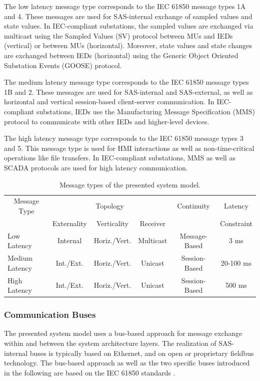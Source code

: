 The low latency message type corresponds to the IEC 61850 \cite{IEC61850P5} message types 1A and 4.
These messages are used for SAS-internal exchange of sampled values and state values.
In IEC-compliant substations, the sampled values are exchanged via multicast using the Sampled Values (SV) protocol between MUs and IEDs (vertical) or between MUs (horizontal).
Moreover, state values and state changes are exchanged between IEDs (horizontal) using the Generic Object Oriented Substation Events (GOOSE) protocol.

The medium latency message type corresponds to the IEC 61850 message types 1B and 2.
These messages are used for SAS-internal and SAS-external, as well as horizontal and vertical session-based client-server communication.
In IEC-compliant substations, IEDs use the Manufacturing Message Specification (MMS) protocol to communicate with other IEDs and higher-level devices.

The high latency message type corresponds to the IEC 61850 message types 3 and 5.
This message type is used for HMI interactions as well as non-time-critical operations like file transfers.
In IEC-compliant substations, MMS as well as SCADA protocols are used for high latency communication.
\begin{table}
    \centering
    \small
    \caption{Message types of the presented system model.}
    \label{tab:message_types}
    \begin{tabular}{l c c c c c}
    \toprule
    \multicolumn{1}{c}{Message Type} & \multicolumn{3}{c}{Topology} & Continuity & Latency\\
    & Externality & Verticality & Receiver & & Constraint\\
    \midrule
    Low Latency & Internal & Horiz./Vert. & Multicast & Message-Based & 3 ms\\
    Medium Latency & Int./Ext. & Horiz./Vert. & Unicast & Session-Based & 20-100 ms\\
    High Latency & Int./Ext. & Horiz./Vert. & Unicast & Session-Based & 500 ms\\
    \bottomrule
    \end{tabular}
\end{table}

\subsubsection{Communication Buses}
The presented system model uses a bus-based approach for message exchange within and between the system architecture layers.
The realization of SAS-internal buses is typically based on Ethernet, and on open or proprietary fieldbus technology.
The bus-based approach as well as the two specific buses introduced in the following are based on the IEC 61850 standards \cite{IEC61850P5}.

